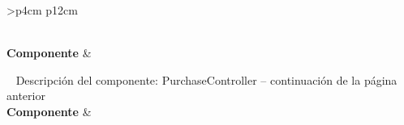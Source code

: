 \begin{longtable}{
    >{}p{4cm}
    p{12cm}
    }
    \caption{Descripción del componente: PurchaseController} \label{table:descripcion_cardpackpurchasecontroller} \\
    \toprule
    \textbf{Componente} &  \\
    \endfirsthead
    
    {{ \tablename\ \thetable{} Descripción del componente: PurchaseController -- continuación de la página anterior}} \\
    \toprule
    \textbf{Componente} &  \\
    \midrule
    \endhead
    
    \midrule
     \\ 
    \endfoot
    
    \bottomrule
    \endlastfoot
    

\end{longtable}
